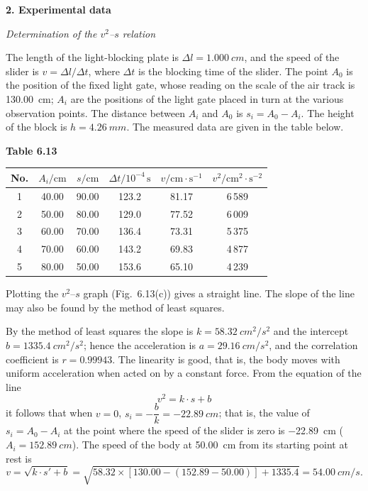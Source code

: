 \textbf{2. Experimental data}

\noindent\textit{Determination of the $v^{2}$--$s$ relation}

The length of the light-blocking plate is $\Delta l=\SI{1.000}{cm}$, and the speed of the slider is $v=\Delta l/\Delta t$, where $\Delta t$ is the blocking time of the slider. The point $A_0$ is the position of the fixed light gate, whose reading on the scale of the air track is \SI{130.00}{cm}; $A_i$ are the positions of the light gate placed in turn at the various observation points. The distance between $A_i$ and $A_0$ is $s_i=A_0-A_i$. The height of the block is $h=\SI{4.26}{mm}$. The measured data are given in the table below.

\begin{center}
\begin{minipage}{\linewidth}
\centering
\textbf{Table 6.13}\\[3pt]
\begin{tabular}{cccccc}
\toprule
No. & $A_i/\mathrm{cm}$ & $s/\mathrm{cm}$ & $\Delta t/10^{-4}\,\mathrm{s}$ & $v/\mathrm{cm\cdot s^{-1}}$ & $v^{2}/\mathrm{cm^{2}\cdot s^{-2}}$\\
\midrule
1 & 40.00 & 90.00 & 123.2 & 81.17 & 6\,589\\
2 & 50.00 & 80.00 & 129.0 & 77.52 & 6\,009\\
3 & 60.00 & 70.00 & 136.4 & 73.31 & 5\,375\\
4 & 70.00 & 60.00 & 143.2 & 69.83 & 4\,877\\
5 & 80.00 & 50.00 & 153.6 & 65.10 & 4\,239\\
\bottomrule
\end{tabular}
\end{minipage}
\end{center}

Plotting the $v^{2}$--$s$ graph (Fig.~6.13(c)) gives a straight line. The slope of the line may also be found by the method of least squares.

By the method of least squares the slope is $k=\SI{58.32}{cm^2/s^2}$ and the intercept $b=\SI{1335.4}{cm^2/s^2}$; hence the acceleration is $a=\SI{29.16}{cm/s^2}$, and the correlation coefficient is $r=0.99943$. The linearity is good, that is, the body moves with uniform acceleration when acted on by a constant force. From the equation of the line
\begin{equation*}
v^{2}=k\cdot s+b
\end{equation*}
it follows that when $v=0$, $s_i=-\dfrac{b}{k}=\SI{-22.89}{cm}$; that is, the value of $s_i=A_0-A_i$ at the point where the speed of the slider is zero is \SI{-22.89}{cm} ($A_i=\SI{152.89}{cm}$). The speed of the body at \SI{50.00}{cm} from its starting point at rest is
\begin{equation*}
v=\sqrt{k\cdot s'+b}
=\sqrt{58.32\times\left[130.00-(152.89-50.00)\right]+1335.4}
=\SI{54.00}{cm/s}.
\end{equation*}


